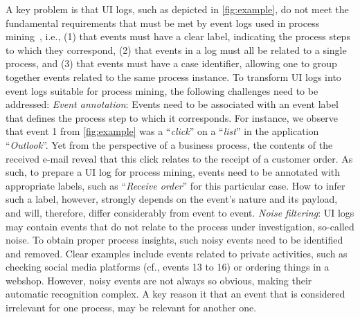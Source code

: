  A key problem is that UI logs, such as depicted in \autoref{fig:example}, do not meet the fundamental requirements that must be met by event logs used in process mining~\cite{van2016data}, i.e., (1) that events must have a clear label, indicating the process steps to which they correspond, (2) that events in a log must all be related to a single process, and (3) that events must have a case identifier, allowing one to group together events related to the same process instance. To transform UI logs into event logs suitable for process mining, the following challenges need to be addressed:
\vspace{0.2em}
\newline%
\textit{Event annotation}: Events need to be associated with an event label that defines the process step to which it corresponds. For instance, we observe that event 1 from \autoref{fig:example} was a ``\textit{click}'' on a ``\textit{list}'' in the application ``\textit{Outlook}''. Yet from the perspective of a business process, the contents of the received e-mail reveal that this click relates to the receipt of a customer order. As such, to prepare a UI log for process mining, events need to be annotated with appropriate labels, such as ``\emph{Receive order}'' for this particular case. How to infer such a label, however, strongly depends on the event's nature and its payload, and will, therefore, differ considerably from event to event.
\vspace{0.2em}
\newline%
\noindent \textit{Noise filtering}: 
UI logs may contain events that do not relate to the process under investigation, so-called noise. To obtain proper process insights, such noisy events need to be identified and removed. Clear examples include events related to private activities, such as checking social media platforms (cf., events 13 to 16) or ordering things in a webshop. 
However, noisy events are not always so obvious, making their automatic recognition complex.
A key reason it that an event that is considered irrelevant for one process, may be relevant for another one.
